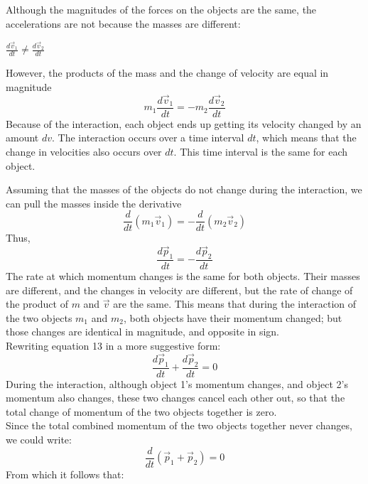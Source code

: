 \documentclass[a4paper]{article}
\begin{document}
Although the magnitudes of the forces on the objects are the same, the accelerations are not because the masses are different:
\begin{center}
    $\displaystyle \frac{d\vec{v}_1}{dt} \neq \frac{d\vec{v}_2}{dt}$
\end{center}
However, the products of the mass and the change of velocity are equal in magnitude
\begin{equation}
    m_1\frac{d\vec{v}_1}{dt} = -m_2\frac{d\vec{v}_2}{dt}
\end{equation}
Because of the interaction, each object ends up getting its velocity changed by an amount $dv$. The interaction occurs over a time interval $dt$, which means that the change in velocities also occurs over $dt$. This time interval is the same for each object.

Assuming that the masses of the objects do not change during the interaction, we can pull the masses inside the derivative
\begin{equation}
    \frac{d}{dt}(m_1\vec{v}_1) = - \frac{d}{dt}(m_2\vec{v}_2)
\end{equation}
Thus,
\begin{equation}
    \frac{d\vec{p}_1}{dt} = -\frac{d\vec{p}_2}{dt}
\end{equation}
The rate at which momentum changes is the same for both objects. Their masses are different, and the changes in velocity are different, but the rate of change of the product of $m$ and $\vec{v}$ are the same. This means that during the interaction of the two objects $m_1$ and $m_2$, both objects have their momentum changed; but those changes are identical in magnitude, and opposite in sign.
\vspace{1mm}\\
Rewriting equation 13 in a more suggestive form:
\begin{equation}
    \frac{d\vec{p}_1}{dt} + \frac{d\vec{p}_2}{dt} = 0
\end{equation}
During the interaction, although object 1's momentum changes, and object 2's momentum also changes, these two changes cancel each other out, so that the total change of momentum of the two objects together is zero.
\vspace{1mm}\\
Since the total combined momentum of the two objects together never changes, we could write:
\begin{equation}
    \frac{d}{dt}(\vec{p}_1 + \vec{p}_2) = 0
\end{equation}
From which it follows that:
\end{document}
